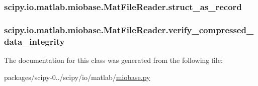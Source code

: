\subsubsection[{struct\+\_\+as\+\_\+record}]{\setlength{\rightskip}{0pt plus 5cm}scipy.\+io.\+matlab.\+miobase.\+Mat\+File\+Reader.\+struct\+\_\+as\+\_\+record}\label{classscipy_1_1io_1_1matlab_1_1miobase_1_1MatFileReader_a890f989a74e10934d37a62b93f9310ef}
\hypertarget{classscipy_1_1io_1_1matlab_1_1miobase_1_1MatFileReader_a7795786ca2430e2b468b1cb409041dc5}{}
\subsubsection[{verify\+\_\+compressed\+\_\+data\+\_\+integrity}]{\setlength{\rightskip}{0pt plus 5cm}scipy.\+io.\+matlab.\+miobase.\+Mat\+File\+Reader.\+verify\+\_\+compressed\+\_\+data\+\_\+integrity}\label{classscipy_1_1io_1_1matlab_1_1miobase_1_1MatFileReader_a7795786ca2430e2b468b1cb409041dc5}


The documentation for this class was generated from the following file\+:\begin{DoxyCompactItemize}
\item 
packages/scipy-\/0../scipy/io/matlab/\hyperlink{miobase_8py}{miobase.\+py}\end{DoxyCompactItemize}
